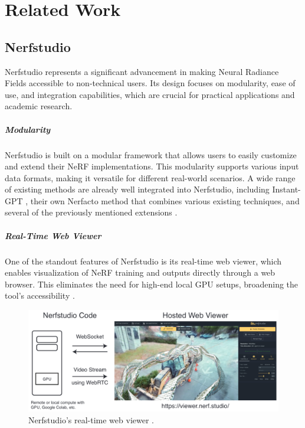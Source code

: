 %
\chapter{Related Work}
\label{sec:related}

\section{Nerfstudio}
\label{sec:related:nerfstudio}

Nerfstudio \cite{tancik_nerfstudio_2023} represents a significant advancement in making Neural Radiance Fields accessible to non-technical users.
Its design focuses on modularity, ease of use, and integration capabilities, which are crucial for practical applications and academic research.

\paragraph{Modularity}
Nerfstudio is built on a modular framework that allows users to easily customize and extend their NeRF implementations.
This modularity supports various input data formats, making it versatile for different real-world scenarios.
A wide range of existing methods are already well integrated into Nerfstudio, including Instant-GPT \cite{muller_instant_2022}, their own Nerfacto \cite{noauthor_nerfacto_nodate} method that combines various existing techniques, and several of the previously mentioned extensions \cite{haque_instruct-nerf2nerf_2023,jan-niklas_dihlmann_signerf_2024}.

\paragraph{Real-Time Web Viewer}
One of the standout features of Nerfstudio is its real-time web viewer, which enables visualization of NeRF training and outputs directly through a web browser.
This eliminates the need for high-end local GPU setups, broadening the tool's accessibility \cite{noauthor_nerfstudio-projectviser_2024}.

\begin{figure}[h!]
  \centering
  \includegraphics[width=\textwidth]{figures/related-nerfstudio-viewer.png}
  \caption{Nerfstudio's real-time web viewer \cite{tancik_nerfstudio_2023}.}
  \label{fig:nerfstudio-viewer}
\end{figure}

